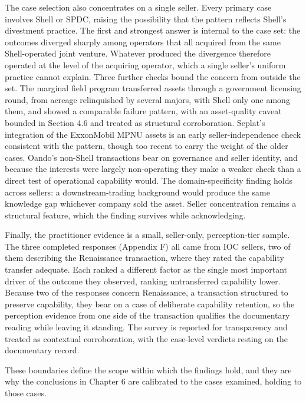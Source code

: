 The case selection also concentrates on a single seller. Every primary
case involves Shell or SPDC, raising the possibility that the pattern
reflects Shell's divestment practice. The first and strongest answer is
internal to the case set: the outcomes diverged sharply among operators
that all acquired from the same Shell-operated joint venture. Whatever
produced the divergence therefore operated at the level of the acquiring
operator, which a single seller's uniform practice cannot explain. Three
further checks bound the concern from outside the set. The marginal
field program transferred assets through a government licensing round,
from acreage relinquished by several majors, with Shell only one among
them, and showed a comparable failure pattern, with an asset-quality
caveat bounded in Section 4.6 and treated as structural corroboration.
Seplat's integration of the ExxonMobil MPNU assets is an early
seller-independence check consistent with the pattern, though too recent
to carry the weight of the older cases. Oando's non-Shell transactions
bear on governance and seller identity, and because the interests were
largely non-operating they make a weaker check than a direct test of
operational capability would. The domain-specificity finding holds
across sellers: a downstream-trading background would produce the same
knowledge gap whichever company sold the asset. Seller concentration
remains a structural feature, which the finding survives while
acknowledging.

Finally, the practitioner evidence is a small, seller-only,
perception-tier sample. The three completed responses (Appendix F) all
came from IOC sellers, two of them describing the Renaissance
transaction, where they rated the capability transfer adequate. Each
ranked a different factor as the single most important driver of the
outcome they observed, ranking untransferred capability lower. Because
two of the responses concern Renaissance, a transaction structured to
preserve capability, they bear on a case of deliberate capability
retention, so the perception evidence from one side of the transaction
qualifies the documentary reading while leaving it standing. The survey
is reported for transparency and treated as contextual corroboration,
with the case-level verdicts resting on the documentary record.

These boundaries define the scope within which the findings hold, and
they are why the conclusions in Chapter 6 are calibrated to the cases
examined, holding to those cases.
